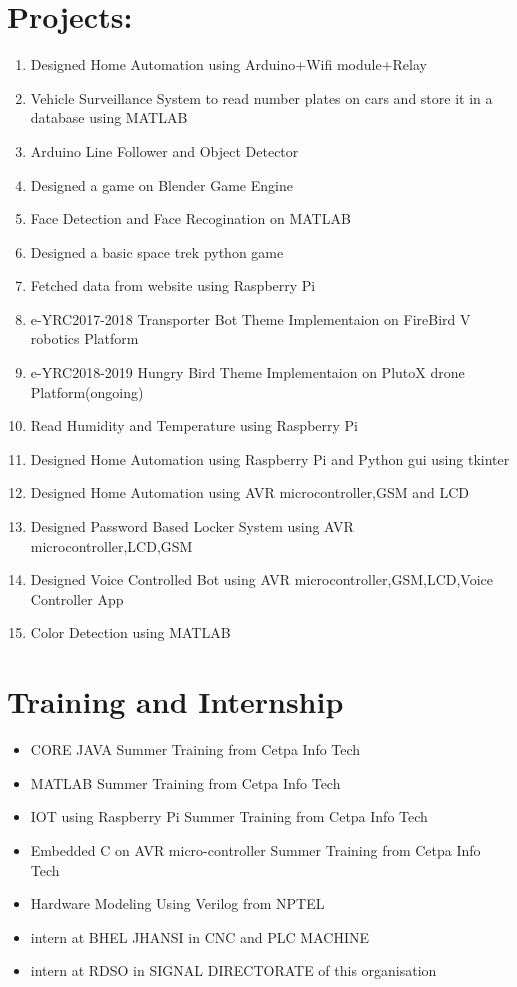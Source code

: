 \documentclass[11pt]{article}
\begin{document}
\section{Projects:}
\begin{enumerate}
 \item Designed Home Automation using Arduino+Wifi module+Relay
  \item Vehicle Surveillance System to read number plates on cars and store it in a database using MATLAB
  \item Arduino Line Follower and Object Detector 
 \item Designed a game on Blender Game Engine
   \item Face Detection and Face Recogination on MATLAB
 \item Designed a basic space trek python game
\item Fetched data from website using Raspberry Pi
 \item e-YRC2017-2018 Transporter Bot Theme Implementaion on FireBird V robotics Platform
 \item e-YRC2018-2019 Hungry Bird Theme Implementaion on PlutoX drone Platform(ongoing)
\item Read Humidity and Temperature using Raspberry Pi
\item Designed Home Automation using Raspberry Pi and Python gui using tkinter
\item Designed Home Automation using AVR microcontroller,GSM and LCD 
\item Designed Password Based Locker System using AVR microcontroller,LCD,GSM
\item Designed Voice Controlled Bot using AVR microcontroller,GSM,LCD,Voice Controller App 
  \item Color Detection using MATLAB
\end{enumerate}
\section{Training and Internship}
\begin{itemize}
 \item CORE JAVA Summer Training from Cetpa Info Tech
\item MATLAB Summer Training from Cetpa Info Tech
\item IOT using Raspberry Pi Summer Training from Cetpa Info Tech
\item Embedded C on AVR micro-controller Summer Training from Cetpa Info Tech
\item Hardware Modeling Using Verilog from NPTEL

\item intern at BHEL JHANSI in CNC and PLC MACHINE

\item intern at RDSO in SIGNAL DIRECTORATE of this organisation 


\end{itemize}
\newpage
\end{document}
